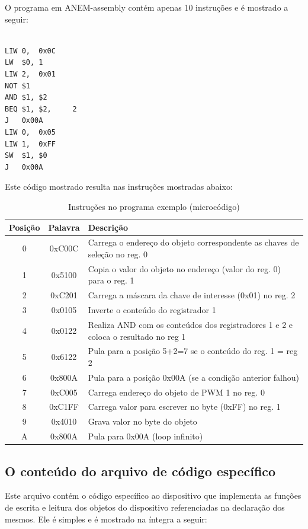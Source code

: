 O programa em ANEM-assembly contém apenas 10 instruções e é mostrado a seguir:

\begin{verbatim}

LIW	0,	0x0C
LW	$0,	1
LIW	2,	0x01
NOT	$1
AND	$1,	$2
BEQ	$1,	$2,		2
J	0x00A
LIW	0,	0x05
LIW	1,	0xFF
SW	$1,	$0
J	0x00A

\end{verbatim}

Este código mostrado resulta nas instruções mostradas abaixo:

\begin{table}[H]
\centering
\caption{Instruções no programa exemplo (microcódigo)}
\begin{tabular}{c c p{10cm}}
\hline
Posição	&	Palavra		&	Descrição\\
\hline
0		&	0xC00C		&	Carrega o endereço do objeto correspondente as chaves de seleção no reg. 0\\
1		&	0x5100		&	Copia o valor do objeto no endereço (valor do reg. 0) para o reg. 1\\
2		&	0xC201		&	Carrega a máscara da chave de interesse (0x01) no reg. 2\\
3		&	0x0105		&	Inverte o conteúdo do registrador 1\\
4		&	0x0122		&	Realiza AND com os conteúdos dos registradores 1 e 2 e coloca o resultado no reg 1\\
5		&	0x6122		&	Pula para a posição 5+2=7 se o conteúdo do reg. 1 = reg 2\\ 
6		&	0x800A		&	Pula para a posição 0x00A (se a condição anterior falhou)\\
7		&	0xC005		&	Carrega endereço do objeto de PWM 1 no reg. 0\\
8		&	0xC1FF		&	Carrega valor para escrever no byte (0xFF) no reg. 1\\
9		&	0x4010		&	Grava valor no byte do objeto\\
A		&	0x800A		&	Pula para 0x00A (loop infinito)\\
\hline
\end{tabular}
\end{table}

\subsection{O conteúdo do arquivo de código específico}

Este arquivo contém o código específico ao dispositivo que implementa as funções de escrita e leitura dos objetos do dispositivo referenciadas na declaração dos mesmos. Ele é simples e é mostrado na íntegra a seguir:

